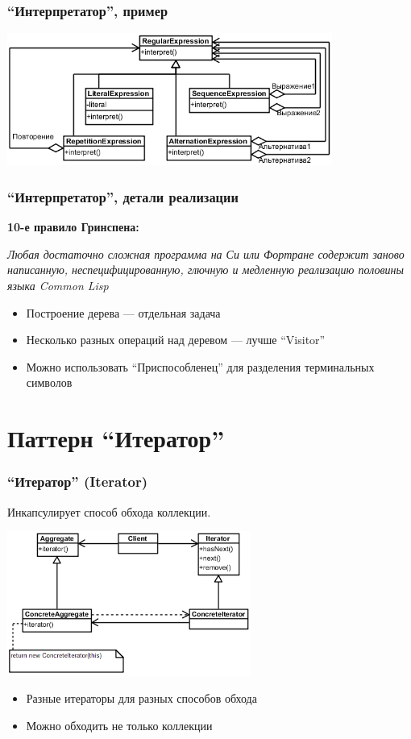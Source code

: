 \documentclass[xetex,mathserif,serif]{beamer}
\begin{document}
	\begin{frame}
		\frametitle{``Интерпретатор'', пример}
		\begin{center}
			\includegraphics[width=0.8\textwidth]{regexp.png}
		\end{center}
	\end{frame}

	\begin{frame}
		\frametitle{``Интерпретатор'', детали реализации}
		\begin{footnotesize}
			\textbf{10-е правило Гринспена:}
			
			\textit{Любая достаточно сложная программа на Си или Фортране содержит заново написанную, неспецифицированную, глючную и медленную реализацию половины языка Common Lisp}
		\end{footnotesize}
		\begin{itemize}
			\item Построение дерева --- отдельная задача
			\item Несколько разных операций над деревом --- лучше ``Visitor''
			\item Можно использовать ``Приспособленец'' для разделения терминальных символов
		\end{itemize}
	\end{frame}

	\section{Паттерн ``Итератор''}

	\begin{frame}
		\frametitle{``Итератор'' (Iterator)}
		Инкапсулирует способ обхода коллекции.
		\begin{center}
			\includegraphics[width=0.6\textwidth]{iterator.png}
		\end{center}
		\begin{itemize}
			\item Разные итераторы для разных способов обхода
			\item Можно обходить не только коллекции
		\end{itemize}
	\end{frame}
\end{document}
